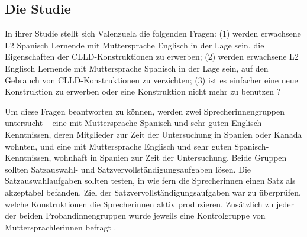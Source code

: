\subsection{Die Studie}
In ihrer Studie stellt sich Valenzuela die folgenden Fragen:
(1) werden erwachsene L2 Spanisch Lernende mit Muttersprache Englisch in der Lage sein, die Eigenschaften der CLLD-Konstruktionen zu erwerben;
(2) werden erwachsene L2 Englisch Lernende mit Muttersprache Spanisch in der Lage sein, auf den Gebrauch von CLLD-Konstruktionen zu verzichten;
(3) ist es einfacher eine neue Konstruktion zu erwerben oder eine Konstruktion nicht mehr zu benutzen \cite{Valenzuela05}?


Um diese Fragen beantworten zu können, werden zwei Sprecherinnengruppen untersucht --
eine mit Muttersprache Spanisch und sehr guten Englisch-Kenntnissen, deren Mitglieder zur Zeit der Untersuchung in Spanien oder Kanada wohnten,
und eine mit Muttersprache Englisch und sehr guten Spanisch-Kenntnissen, wohnhaft in Spanien zur Zeit der Untersuchung.
Beide Gruppen sollten Satzauswahl- und Satzvervollständigungsaufgaben lösen.
Die Satzauswahlaufgaben sollten testen, in wie fern die Sprecherinnen einen Satz als akzeptabel befanden.
Ziel der Satzvervollständigungsaufgaben war zu überprüfen, welche Konstruktionen die Sprecherinnen aktiv produzieren.
Zusätzlich zu jeder der beiden Probandinnengruppen wurde jeweils eine Kontrolgruppe von Muttersprachlerinnen befragt \cite{Valenzuela05}.


